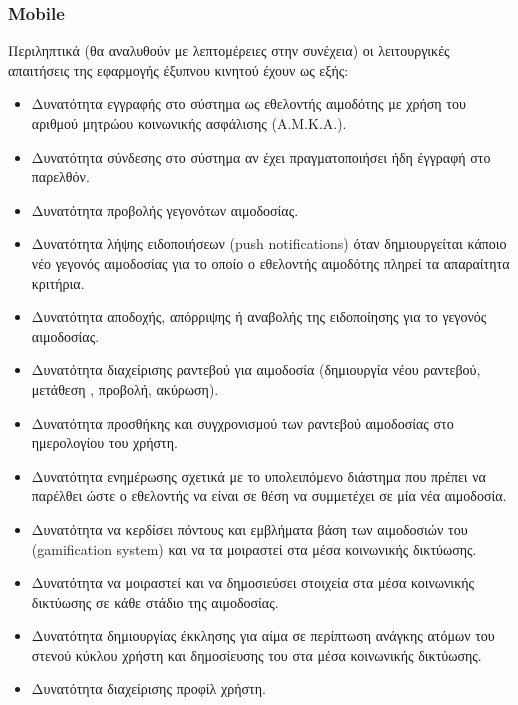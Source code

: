 		\subsubsection{Mobile} \label{sssec:functional_requirements_mobile}
			Περιληπτικά (θα αναλυθούν με λεπτομέρειες στην συνέχεια) οι λειτουργικές απαιτήσεις της εφαρμογής έξυπνου κινητού έχουν ως εξής:
			\begin{itemize}
				\item Δυνατότητα εγγραφής στο σύστημα ως εθελοντής αιμοδότης με χρήση του αριθμού μητρώου κοινωνικής ασφάλισης (Α.Μ.Κ.Α.).
				\item Δυνατότητα σύνδεσης στο σύστημα αν έχει πραγματοποιήσει ήδη έγγραφή στο παρελθόν.
				\item Δυνατότητα προβολής γεγονότων αιμοδοσίας.
				\item Δυνατότητα λήψης ειδοποιήσεων (push notifications) όταν δημιουργείται κάποιο νέο γεγονός αιμοδοσίας για το οποίο ο εθελοντής αιμοδότης πληρεί τα απαραίτητα κριτήρια.
				\item Δυνατότητα αποδοχής, απόρριψης ή αναβολής της ειδοποίησης για το γεγονός αιμοδοσίας.
				\item Δυνατότητα διαχείρισης ραντεβού για αιμοδοσία (δημιουργία νέου ραντεβού, μετάθεση , προβολή, ακύρωση).
				\item Δυνατότητα προσθήκης και συγχρονισμού των ραντεβού αιμοδοσίας στο ημερολογίου του χρήστη.
				\item Δυνατότητα ενημέρωσης σχετικά με το υπολειπόμενο διάστημα που πρέπει να παρέλθει ώστε ο εθελοντής να είναι σε θέση να συμμετέχει σε μία νέα αιμοδοσία.
				\item Δυνατότητα να κερδίσει πόντους και εμβλήματα βάση των αιμοδοσιών του (gamification system) και να τα μοιραστεί στα μέσα κοινωνικής δικτύωσης.
				\item Δυνατότητα να μοιραστεί και να δημοσιεύσει στοιχεία στα μέσα κοινωνικής δικτύωσης σε κάθε στάδιο της αιμοδοσίας.
				\item Δυνατότητα δημιουργίας έκκλησης για αίμα σε περίπτωση ανάγκης ατόμων του στενού κύκλου χρήστη και δημοσίευσης του στα μέσα κοινωνικής δικτύωσης.
				\item Δυνατότητα διαχείρισης προφίλ χρήστη.
			\end{itemize}
